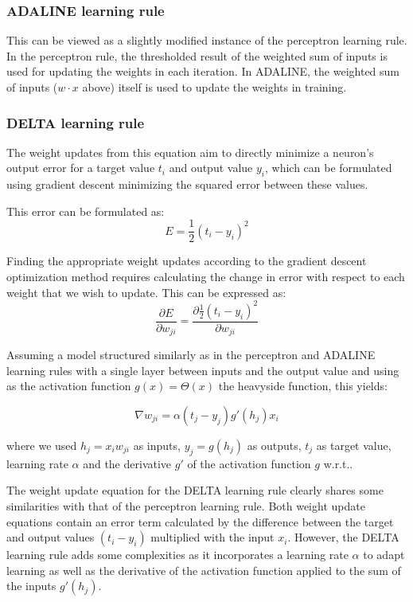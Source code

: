 \documentclass[main]{subfiles}
\begin{document}
\subsubsection{ADALINE learning rule}

This can be viewed as a slightly modified instance of the perceptron learning rule. In the perceptron rule, the thresholded result of the weighted sum of inputs is used for updating the weights in each iteration. In ADALINE, the weighted sum of inputs ($w \cdot x$ above) itself is used to update the weights in training.

\subsubsection{DELTA learning rule}

The weight updates from this equation aim to directly minimize a neuron's output error for a target value $t_i$ and output value $y_i$, which can be formulated using gradient descent minimizing the squared error between these values.

This error can be formulated as:
$$E = \frac{1}{2} (t_i - y_i)^2$$

Finding the appropriate weight updates according to the gradient descent optimization method requires calculating the change in error with respect to each weight that we wish to update. This can be expressed as:
$$\frac{\partial E}{\partial w_{ji}} = \frac{\partial \frac{1}{2} (t_i - y_i)^2}{\partial w_{ji}}$$

Assuming a model structured similarly as in the perceptron and ADALINE learning rules with a single layer between inputs and the output value and using as the activation function $g(x)=\Theta(x)$ the heavyside function, this yields:

$$\nabla w_{ji} = \alpha (t_j - y_j) g'(h_j) x_i$$

where we used $h_j=x_{i}w_{ji}$ as inputs, $y_j = g(h_j)$ as outputs, $t_j$ as target value, learning rate $\alpha$ and the derivative $g'$ of the activation function $g$ w.r.t..

The weight update equation for the DELTA learning rule clearly shares some similarities with that of the perceptron learning rule. Both weight update equations contain an error term calculated by the difference between the target and output values $(t_i - y_i)$ multiplied with the input $x_i$. However, the DELTA learning rule adds some complexities as it incorporates a learning rate $\alpha$ to adapt learning as well as the derivative of the activation function applied to the sum of the inputs $g'(h_j)$.
\end{document}
